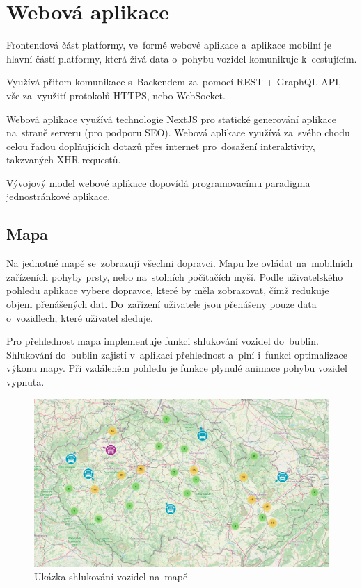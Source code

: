 \section{Webová aplikace}

Frontendová část platformy, ve~formě webové aplikace a~aplikace mobilní je hlavní částí platformy, která živá data o~pohybu vozidel komunikuje k~cestujícím.

Využívá přitom komunikace s~Backendem za~pomocí REST + GraphQL API, vše za~využití protokolů HTTPS, nebo WebSocket.

Webová aplikace využívá technologie NextJS pro statické generování aplikace na~straně serveru (pro podporu SEO). Webová aplikace využívá za~svého chodu celou řadou doplňujících dotazů přes internet pro~dosažení interaktivity, takzvaných XHR requestů.

Vývojový model webové aplikace dopovídá programovacímu paradigma jednostránkové aplikace. \cite{singlepageapp}

\subsection{Mapa}
Na jednotné mapě se~zobrazují všechni dopravci. Mapu lze ovládat na~mobilních zařízeních pohyby prsty, nebo na~stolních počítačích myší. Podle uživatelského pohledu aplikace vybere dopravce, které by měla zobrazovat, čímž redukuje objem přenášených dat. Do~zařízení uživatele jsou přenášeny pouze data o~vozidlech, které uživatel sleduje.

Pro přehlednost mapa implementuje funkci shlukování vozidel do~bublin. Shlukování do~bublin zajistí v~aplikaci přehlednost a~plní i~funkci optimalizace výkonu mapy. Při vzdáleném pohledu je funkce plynulé animace pohybu vozidel vypnuta.
\begin{figure}[H]
    \centering
    \includegraphics[width=1\textwidth]{images/global_map.png}
    \caption{Ukázka shlukování vozidel na~mapě}
    \label{shlukovani}
\end{figure}
